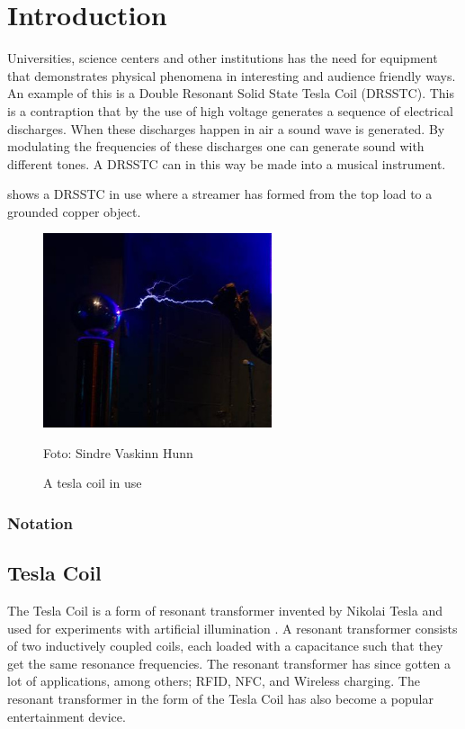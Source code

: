 \chapter{Introduction}
\label{intro}
Universities, science centers and other institutions has the need for equipment that demonstrates physical phenomena in interesting and audience friendly ways. An example of this is a Double Resonant Solid State Tesla Coil (DRSSTC). This is a contraption that by the use of high voltage generates a sequence of electrical discharges. When these discharges happen in air a sound wave is generated. By modulating the frequencies of these discharges one can generate sound with different tones. A DRSSTC can in this way be made into a musical instrument.



 shows a DRSSTC in use where a streamer has formed from the top load to a grounded copper object.

\begin{figure}[ht]
    \centering
    \includegraphics[width=0.6\textwidth]{img/teslabano.jpg}
    \caption{A tesla coil in use}
    Foto: Sindre Vaskinn Hunn
    \label{fig:teslabano}
\end{figure}

\subsection{Notation}


\section{Tesla Coil}
\label{tesla}
The Tesla Coil is a form of resonant transformer invented by Nikolai Tesla and used for experiments with artificial illumination \citep{5570149}. A resonant transformer consists of two inductively coupled coils, each loaded with a capacitance such that they get the same resonance frequencies. The resonant transformer has since gotten a lot of applications, among others; RFID, NFC, and Wireless charging. The resonant transformer in the form of the Tesla Coil has also become a popular entertainment device.

